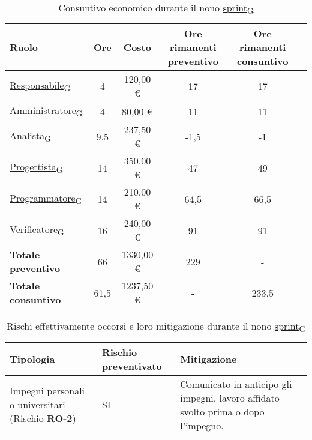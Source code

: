 \newpage
{} 
\begin{table}[!h]
    \centering
    \begin{tabular}{ | l | c | c | c | c | c | }
        \hline
        \textbf{Ruolo} & \textbf{Ore} & \textbf{Costo} & \textbf{Ore rimanenti preventivo} & \textbf{Ore rimanenti consuntivo} \\
        \hline
        \href{https://7last.github.io/docs/rtb/documentazione-interna/glossario\#responsabile}{Responsabile\textsubscript{G}}     &  4   &  120,00 € &  17   &  17   \\
        \href{https://7last.github.io/docs/rtb/documentazione-interna/glossario\#amministratore}{Amministratore\textsubscript{G}} &  4   &   80,00 € &  11   &  11   \\
        \href{https://7last.github.io/docs/rtb/documentazione-interna/glossario\#analista}{Analista\textsubscript{G}}             &  9,5 &  237,50 € &  -1,5 &  -1   \\
        \href{https://7last.github.io/docs/rtb/documentazione-interna/glossario\#progettista}{Progettista\textsubscript{G}}       & 14   &  350,00 € &  47   &  49   \\
        \href{https://7last.github.io/docs/rtb/documentazione-interna/glossario\#programmatore}{Programmatore\textsubscript{G}}   & 14   &  210,00 € &  64,5 &  66,5 \\
        \href{https://7last.github.io/docs/rtb/documentazione-interna/glossario\#verificatore}{Verificatore\textsubscript{G}}     & 16   &  240,00 € &  91   &  91   \\
        \hline
        \textbf{Totale preventivo} &  66   & 1330,00 € & 229   &    -   \\
        \hline
        \textbf{Totale consuntivo} &  61,5 & 1237,50 € &   -   &  233,5 \\
        \hline
    \end{tabular}
    \caption{Consuntivo economico durante il nono \href{https://7last.github.io/docs/rtb/documentazione-interna/glossario\#sprint}{sprint\textsubscript{G}}}

\end{table}

\begin{table}[!h]
    \centering
    \begin{tabular}{ | p{6cm} | p{2.5cm} | p{7.5cm} | }
        \hline
        \textbf{Tipologia} & \textbf{Rischio preventivato} & \textbf{Mitigazione}  \\
        \hline
        Impegni personali o universitari (Rischio \textbf{RO-2})& SI & Comunicato in anticipo gli impegni, lavoro affidato svolto prima o dopo l’impegno. \\
        \hline
    \end{tabular}
    \caption{Rischi effettivamente occorsi e loro mitigazione durante il nono \href{https://7last.github.io/docs/rtb/documentazione-interna/glossario\#sprint}{sprint\textsubscript{G}}}
\end{table}

